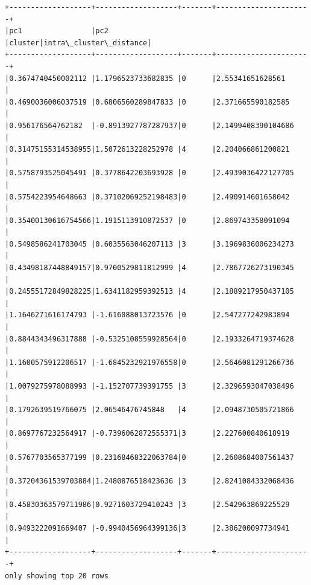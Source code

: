 \documentclass[11pt]{article}
\begin{document}
    \begin{Verbatim}[commandchars=\\\{\}]
+-------------------+-------------------+-------+----------------------+
|pc1                |pc2                |cluster|intra\_cluster\_distance|
+-------------------+-------------------+-------+----------------------+
|0.3674740450002112 |1.1796523733682835 |0      |2.55341651628561      |
|0.4690036006037519 |0.6806560289847833 |0      |2.371665590182585     |
|0.956176564762182  |-0.8913927787287937|0      |2.1499408390104686    |
|0.31475155314538955|1.5072613228252978 |4      |2.204066861200821     |
|0.5758793525045491 |0.3778642203693928 |0      |2.4939036422127705    |
|0.5754223954648663 |0.37102069252198483|0      |2.490914601658042     |
|0.35400130616754566|1.1915113910872537 |0      |2.869743358091094     |
|0.5498586241703045 |0.6035563046207113 |3      |3.1969836006234273    |
|0.43498187448849157|0.9700529811812999 |4      |2.7867726273190345    |
|0.24555172849828225|1.6341182959392513 |4      |2.1889217950437105    |
|1.1646271616174793 |-1.616088013723576 |0      |2.547277242983894     |
|0.8844343496317888 |-0.5325108559928564|0      |2.1933264719374628    |
|1.1600575912206517 |-1.6845232921976558|0      |2.5646081291266736    |
|1.0079275978088993 |-1.152707739391755 |3      |2.3296593047038496    |
|0.1792639519766075 |2.06546476745848   |4      |2.0948730505721866    |
|0.8697767232564917 |-0.7396062872555371|3      |2.227600840618919     |
|0.5767703565377199 |0.23168468322063784|0      |2.2608684007561437    |
|0.37204361539703884|1.2480876518423636 |3      |2.8241084332068436    |
|0.45830363579711986|0.9271603729410243 |3      |2.542963869225529     |
|0.9493222091669407 |-0.9940456964399136|3      |2.386200097734941     |
+-------------------+-------------------+-------+----------------------+
only showing top 20 rows

    \end{Verbatim}
\end{document}
